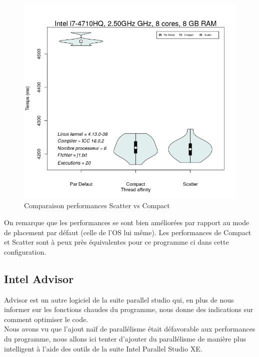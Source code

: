\documentclass[
 aip,
 jmp,
 amsmath,amssymb,
 reprint
]{revtex4-1}
\begin{document}
\begin{figure}[H]
  \includegraphics[width=\linewidth, keepaspectratio=true]{defaultVSscatterVScompact.png}
  \caption{Comparaison performances Scatter vs Compact\label{Fig:scatter_compact}}
\end{figure}

On remarque que les performances se sont bien améliorées par rapport au mode de placement par défaut (celle de l'OS lui même). Les performances de Compact et Scatter sont à peux près équivalentes pour ce programme ci dans cette configuration.

\subsection{Intel Advisor}
Advisor est un autre logiciel de la suite parallel studio qui, en plus de nous informer sur les fonctions chaudes du programme, nous donne des indications sur comment optimiser le code.\\
Nous avons vu que l'ajout naïf de parallélisme était défavorable aux performances du programme, nous allons ici tenter d'ajouter du parallélisme de manière plus intelligent à l'aide des outils de la suite Intel Parallel Studio XE.\\
\end{document}
